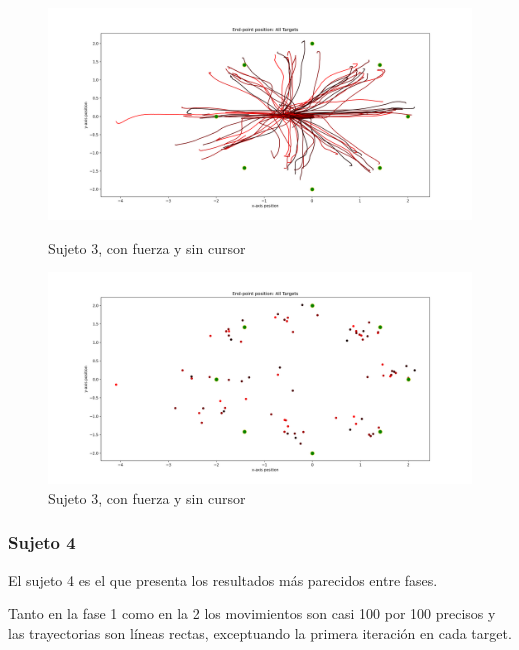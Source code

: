 \documentclass[a4paper,11pt, oneside]{book}
\begin{document}
\begin{figure}[H]
	\begin{minipage}[b]{0.5\linewidth}
		\centering
		\includegraphics[width=\linewidth]{sujeto3/force_no_cursor/trayectorias}
		\caption{Sujeto 3, con fuerza y sin cursor}
		\label{fig:figura1}
	\end{minipage}
	\hspace{0.5cm}
	\begin{minipage}[b]{0.5\linewidth}
		\centering
		\includegraphics[width=\linewidth]{sujeto3/force_no_cursor/trayectorias_puntos}
		\caption{Sujeto 3, con fuerza y sin cursor}
		\label{fig:figura2}
	\end{minipage}
\end{figure}



\subsubsection{Sujeto 4}

El sujeto 4 es el que presenta los resultados más parecidos entre fases. 

Tanto en la fase 1 como en la 2 los movimientos son casi 100 por 100 precisos y las trayectorias son líneas rectas, exceptuando la primera iteración en cada target.
\end{document}
